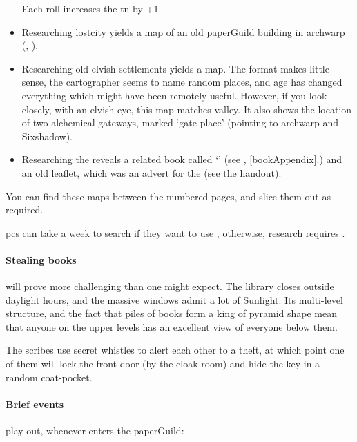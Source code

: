 \begin{multicols}{2}
\begin{itemize}
  Each roll increases the \gls{tn} by +1.
  \item
  Researching \gls{lostcity} yields a map of an old \gls{paperGuild} building in \gls{archwarp} (, \tn[18]).
  \item
  Researching old elvish settlements yields a map.
  The format makes little sense, the cartographer seems to name random places, and age has changed everything which might have been remotely useful.
  However, if you look closely, with an elvish eye, this map matches \gls{valley}.
  It also shows the location of two alchemical gateways, marked `gate place' (pointing to \gls{archwarp} and Sixshadow).
  \item
  Researching the  reveals a related book called `' (see , \autoref{bookAppendix}.) and an old leaflet, which was an advert for the  (see the handout).
\end{itemize}

You can find these maps between the numbered pages, and slice them out as required.

\Glspl{pc} can take a week to search if they want to use , otherwise, research requires .

\paragraph{Stealing books}
will prove more challenging than one might expect.
The library closes outside daylight hours, and the massive windows admit a lot of Sunlight.
Its multi-level structure, and the fact that piles of books form a king of pyramid shape mean that anyone on the upper levels has an excellent view of everyone below them.

The \glspl{scribe} use secret whistles to alert each other to a theft, at which point one of them will lock the front door (by the cloak-room) and hide the key in a random coat-pocket.

\paragraph{Brief events}
play out, whenever  enters the \gls{paperGuild}:


\end{multicols}
